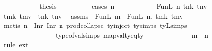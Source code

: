 \begin{isabellebody}
\ \ \ \ \ \ \ \ \isamarkupfalse%
\ \isamarkupfalse%
\ {\isacharquery}{\kern0pt}thesis\isanewline
\ \ \ \ \ \ \ \ \isamarkupfalse%
\ {\isacharparenleft}{\kern0pt}cases\ n{\isacharprime}{\kern0pt}{\isacharparenright}{\kern0pt}\isanewline
\ \ \ \ \ \ \ \ \ \ \isamarkupfalse%
\ {\isacharparenleft}{\kern0pt}FunL\ n{\isacharprime}{\kern0pt}{\isacharprime}{\kern0pt}\ tnk\ tnv{\isacharparenright}{\kern0pt}\isanewline
\ \ \ \ \ \ \ \ \ \ \isamarkupfalse%
\ {\isachardoublequoteopen}{\isacharparenleft}{\kern0pt}tmk{\isacharcomma}{\kern0pt}\ tmv{\isacharparenright}{\kern0pt}\ {\isacharequal}{\kern0pt}\ {\isacharparenleft}{\kern0pt}tnk{\isacharcomma}{\kern0pt}\ tnv{\isacharparenright}{\kern0pt}{\isachardoublequoteclose}\ \isamarkupfalse%
\ assms{\isacharparenleft}{\kern0pt}{}{\isacharparenright}{\kern0pt}\ {}\ FunL\ {\isacartoucheopen}m{\isacharprime}{\kern0pt}\ {\isacharequal}{\kern0pt}\ FunL\ m{\isacharprime}{\kern0pt}{\isacharprime}{\kern0pt}\ tmk\ tmv{\isacartoucheclose}\isanewline
\ \ \ \ \ \ \ \ \ \ \ \ \isamarkupfalse%
\ {\isacharparenleft}{\kern0pt}metis\ {\isacartoucheopen}n\ {\isacharequal}{\kern0pt}\ Inr\ {\isacharparenleft}{\kern0pt}Inr\ n{\isacharprime}{\kern0pt}{\isacharparenright}{\kern0pt}{\isacartoucheclose}\ prod{\isachardot}{\kern0pt}collapse\ ty{\isachardot}{\kern0pt}inject{\isacharparenleft}{\kern0pt}{}{\isacharparenright}{\kern0pt}\ ty{}{}{}{\isachardot}{\kern0pt}simps{\isacharparenleft}{\kern0pt}{}{\isacharparenright}{\kern0pt}\ tyL{\isachardot}{\kern0pt}simps{\isacharparenleft}{\kern0pt}{}{\isacharparenright}{\kern0pt}\isanewline
\ \ \ \ \ \ \ \ \ \ \ \ \ \ \ \ type{\isacharunderscore}{\kern0pt}of{\isacharunderscore}{\kern0pt}val{\isachardot}{\kern0pt}simps{\isacharparenleft}{\kern0pt}{}{\isacharparenright}{\kern0pt}\ mapval{\isacharunderscore}{\kern0pt}ty{\isacharunderscore}{\kern0pt}eq{\isacharunderscore}{\kern0pt}ty{}{}{}{\isacharparenright}{\kern0pt}\isanewline
\ \ \ \ \ \ \ \ \ \ \isamarkupfalse%
\ \isamarkupfalse%
\ {\isachardoublequoteopen}m{\isacharprime}{\kern0pt}{\isacharprime}{\kern0pt}\ {\isacharequal}{\kern0pt}\ n{\isacharprime}{\kern0pt}{\isacharprime}{\kern0pt}{\isachardoublequoteclose}\isanewline
\ \ \ \ \ \ \ \ \ \ \isamarkupfalse%
\ {\isacharparenleft}{\kern0pt}rule\ ext{\isacharparenright}{\kern0pt}\isanewline

\end{isabellebody}
